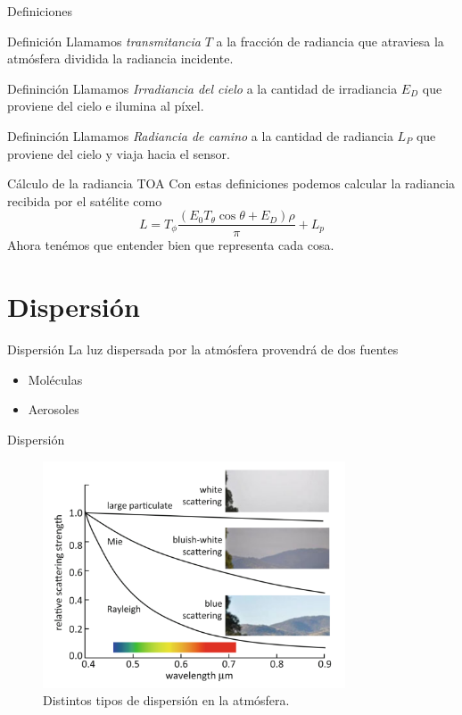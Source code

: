 \documentclass[handout]{beamer}
\begin{document}
\begin{frame}{Definiciones}
  \begin{block}{Definición}
    Llamamos \emph{transmitancia} $T$ a la fracción de radiancia que atraviesa la atmósfera dividida la radiancia incidente.
  \end{block}\pause
  \begin{block}{Defininción}
    Llamamos \emph{Irradiancia del cielo} a la cantidad de irradiancia $E_D$ que proviene del cielo e ilumina al píxel.
  \end{block}
  \pause
  \begin{block}{Defininción}
    Llamamos \emph{Radiancia de camino} a la cantidad de radiancia $L_P$ que proviene del cielo y viaja hacia el sensor.
  \end{block}
\end{frame}

\begin{frame}{Cálculo de la radiancia TOA}
  Con estas definiciones podemos calcular la radiancia recibida por el satélite como
  \begin{equation}
    L = T_\phi \frac{(E_0 T_\theta \cos \theta + E_D)\rho}{\pi} + L_p
  \end{equation}\pause
  Ahora tenémos que entender bien que representa cada cosa.
\end{frame}

\section{Dispersión}
\begin{frame}{Dispersión}
  La luz dispersada por la atmósfera provendrá de dos fuentes
  \begin{itemize}
    \item Moléculas
    \item Aerosoles
  \end{itemize}
\end{frame}
\begin{frame}{Dispersión}
  \begin{figure}
  \centering
  \includegraphics[width=0.8\textwidth]{imagenes/dispersion.png}
  \caption{Distintos tipos de dispersión en la atmósfera.}
  \end{figure}
\end{frame}
\end{document}
